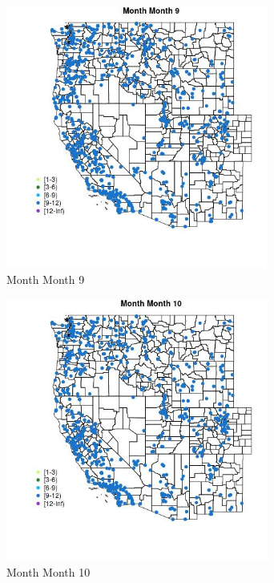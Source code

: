 \begin{figure} 
\centering  
\includegraphics[width=0.77\textwidth]{Code_Outputs/Report_ML_input_PM25_Step4_part_e_de_duplicated_aveswNAs_MapObsMo9Month.jpg} 
\caption{\label{fig:Report_ML_input_PM25_Step4_part_e_de_duplicated_aveswNAsMapObsMo9Month}Month Month 9} 
\end{figure} 
 

\begin{figure} 
\centering  
\includegraphics[width=0.77\textwidth]{Code_Outputs/Report_ML_input_PM25_Step4_part_e_de_duplicated_aveswNAs_MapObsMo10Month.jpg} 
\caption{\label{fig:Report_ML_input_PM25_Step4_part_e_de_duplicated_aveswNAsMapObsMo10Month}Month Month 10} 
\end{figure} 
 

